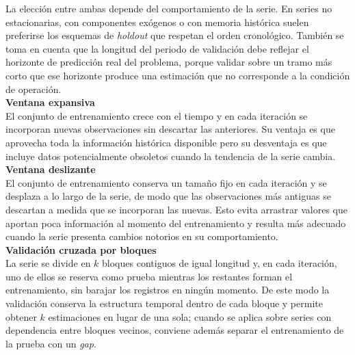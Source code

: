 La elección entre ambas depende del comportamiento de la serie. En series no estacionarias, con componentes exógenos o con memoria histórica suelen preferirse los esquemas de \textit{holdout} que respetan el orden cronológico. También se toma en cuenta que la longitud del periodo de validación debe reflejar el horizonte de predicción real del problema, porque validar sobre un tramo más corto que ese horizonte produce una estimación que no corresponde a la condición de operación.\\[.15cm]

\textbf{Ventana expansiva}\\[.15cm]
El conjunto de entrenamiento crece con el tiempo y en cada iteración se incorporan nuevas observaciones sin descartar las anteriores. Su ventaja es que aprovecha toda la información histórica disponible pero su desventaja es que incluye datos potencialmente obsoletos cuando la tendencia de la serie cambia.\\[.15cm]


\textbf{Ventana deslizante}\\[.15cm]
El conjunto de entrenamiento conserva un tamaño fijo en cada iteración y se desplaza a lo largo de la serie, de modo que las observaciones más antiguas se descartan a medida que se incorporan las nuevas. Esto evita arrastrar valores que aportan poca información al momento del entrenamiento y resulta más adecuado cuando la serie presenta cambios notorios en su comportamiento.\\[.15cm]


\textbf{Validación cruzada por bloques}\\[.15cm]
La serie se divide en $k$ bloques contiguos de igual longitud y, en cada iteración, uno de ellos se reserva como prueba mientras los restantes forman el entrenamiento, sin barajar los registros en ningún momento. De este modo la validación conserva la estructura temporal dentro de cada bloque y permite obtener $k$ estimaciones en lugar de una sola; cuando se aplica sobre series con dependencia entre bloques vecinos, conviene además separar el entrenamiento de la prueba con un \textit{gap}.\\[.15cm]


